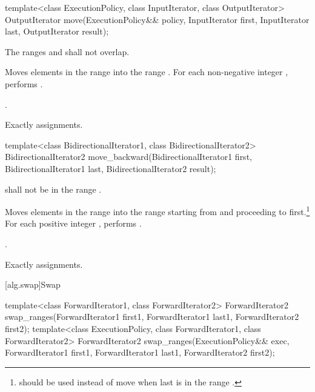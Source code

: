%
\begin{itemdecl}
template<class ExecutionPolicy, class InputIterator, class OutputIterator>
  OutputIterator move(ExecutionPolicy&& policy,
                      InputIterator first, InputIterator last, OutputIterator result);
\end{itemdecl}

\begin{itemdescr}
\pnum
\requires The ranges  and
 shall not overlap.

\pnum
\effects Moves elements in the range  into
the range .
For each non-negative integer ,
performs .

\pnum
\returns {}.

\pnum
\complexity Exactly  assignments.
\end{itemdescr}

%
\begin{itemdecl}
template<class BidirectionalIterator1, class BidirectionalIterator2>
  BidirectionalIterator2
    move_backward(BidirectionalIterator1 first,
                  BidirectionalIterator1 last,
                  BidirectionalIterator2 result);
\end{itemdecl}

\begin{itemdescr}
\pnum
\requires
{}
shall not be in the range
.

\pnum
\effects
Moves elements in the range 
into the
range 
starting from
and proceeding to first.\footnote{
should be used instead of move when last
is in
the range
.}
For each positive integer
,
performs
.

\pnum
\returns
{}.

\pnum
\complexity
Exactly
assignments.
\end{itemdescr}

[alg.swap]{Swap}

%
\begin{itemdecl}
template<class ForwardIterator1, class ForwardIterator2>
  ForwardIterator2
    swap_ranges(ForwardIterator1 first1, ForwardIterator1 last1,
                ForwardIterator2 first2);
template<class ExecutionPolicy, class ForwardIterator1, class ForwardIterator2>
  ForwardIterator2
    swap_ranges(ExecutionPolicy&& exec,
                ForwardIterator1 first1, ForwardIterator1 last1,
                ForwardIterator2 first2);
\end{itemdecl}

